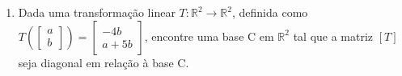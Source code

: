 \documentclass[a4paper,12pt]{article}
\begin{document}
\begin{enumerate}
\item Dada uma transformação linear $T: \mathbb{R}^2 \to \mathbb{R}^2$, definida como $T\left(\begin{bmatrix} a \\ b \end{bmatrix}\right) = \begin{bmatrix} -4b \\ a + 5b \end{bmatrix}$, encontre uma base C em $\mathbb{R}^2$ tal que a matriz $[T]$ seja diagonal em relação à base C.

\end{enumerate}
\end{document}
